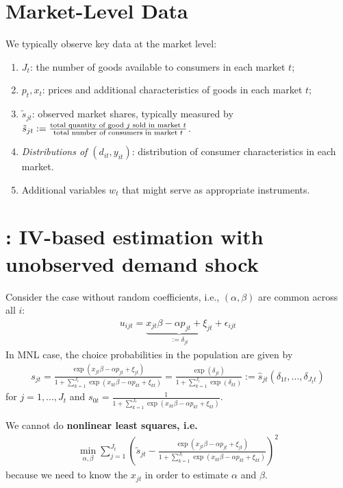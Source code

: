 \documentclass[11pt]{elegantbook}
\begin{document}
\section{Market-Level Data}
We typically observe key data at the market level:
\begin{enumerate}
    \item $J_t$: the number of goods available to consumers in each market $t$;
    \item $p_t,x_t$: prices and additional characteristics of goods in each market $t$;
    \item $\tilde{s}_{jt}$: observed market shares, typically measured by $\tilde{s}_{jt}:=\frac{\textnormal{total quantity of good $j$ sold in market $t$}}{\textnormal{total number of consumers in market $t$}}$.
    \item \textit{Distributions of $(d_{it},y_{it})$}: distribution of consumer characteristics in each market.
    \item Additional variables $w_t$ that might serve as appropriate instruments.
\end{enumerate}



\section{\cite{berry1994estimating}: IV-based estimation with unobserved demand shock}
Consider the case without random coefficients, i.e., $(\alpha,\beta)$ are common across all $i$:
\begin{equation}
    \begin{aligned}
        u_{ijt}=\underbrace{x_{jt}\beta-\alpha p_{jt}+\xi_{jt}}_{:=\delta_{jt}}+\epsilon_{ijt}
    \end{aligned}
    \nonumber
\end{equation}
In MNL case, the choice probabilities in the population are given by
\begin{equation}
    \begin{aligned}
        s_{jt}=\frac{\exp(x_{jt}\beta-\alpha p_{jt}+\xi_{jt})}{1+\sum_{k=1}^{J_t}\exp(x_{kt}\beta-\alpha p_{kt}+\xi_{kt})}=\frac{\exp(\delta_{jt})}{1+\sum_{k=1}^{J_t}\exp(\delta_{kt})}:=\hat{s}_{jt}(\delta_{1t},...,\delta_{J_tt})
    \end{aligned}
    \label{eq:s_jt}
\end{equation}
for $j=1,...,J_t$ and $s_{0t}=\frac{1}{1+\sum_{k=1}^{J_t}\exp(x_{kt}\beta-\alpha p_{kt}+\xi_{kt})}$.

\begin{note}
    We cannot do \textbf{nonlinear least squares, i.e.}
    \begin{equation}
        \begin{aligned}
            \min_{\alpha,\beta} \sum_{j=1}^{J_t}\left(\tilde{s}_{jt}-\frac{\exp(x_{jt}\beta-\alpha p_{jt}+\xi_{jt})}{1+\sum_{k=1}^{J_t}\exp(x_{kt}\beta-\alpha p_{kt}+\xi_{kt})}\right)^2
        \end{aligned}
        \nonumber
    \end{equation}
    because we need to know the $x_{jt}$ in order to estimate $\alpha$ and $\beta$.
\end{note}
\end{document}
